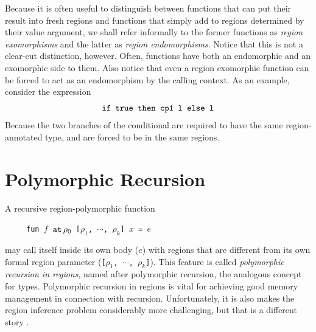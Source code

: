 \documentclass[12pt]{book}
\begin{document}
Because it is often useful to distinguish between functions that can
put their result into fresh regions and functions that simply add to
regions determined by their value argument, we shall refer informally
to the former functions as 
%
{\em region exomorphisms} and the latter as
%
{\em region endomorphisms}. Notice that this is not a clear-cut
distinction, however. Often, functions have both an endomorphic and an
exomorphic side to them. Also notice that even a region exomorphic
function can be forced to act as an endomorphism by the calling
context. As an example, consider the expression
$$\hbox{\tt if true then cp1 l else l}$$
Because the two branches of the conditional are required to have the same region-annotated
type,  and  are forced to be in the same regions.
%
\section{Polymorphic Recursion}
%
\label{polyrec.sec}
A recursive region-polymorphic function
\begin{tabbing}
\ \ \ \ \ \=\tt fun $f$ $\mathbin{\hbox{\tt at}}\,\rho_0$ [$\rho_1$, $\cdots$, $\rho_k$] $x$ = $e$
\end{tabbing}
may call itself inside its own body ($e$) with regions that are different
from its own formal region parameter ({\tt [$\rho_1$, $\cdots$, $\rho_k$]}).
This feature is called {\it polymorphic recursion in regions}, named after
polymorphic recursion, the analogous concept for types.
Polymorphic recursion in regions is vital for achieving good 
memory management in connection with recursion.
Unfortunately, it is also makes  the region inference problem considerably more
challenging, but that is a different story \cite{tofte:birkedal:98}.
\end{document}
